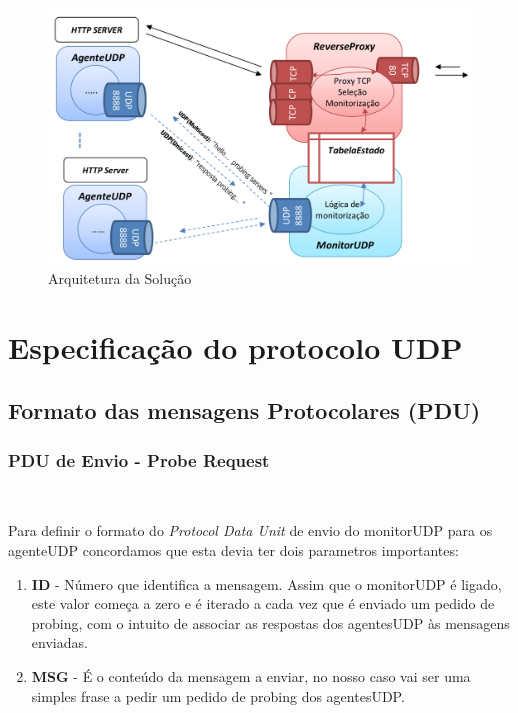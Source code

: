 \documentclass{llncs}
\begin{document}
		\begin{figure}[h!]
		\centering
		\includegraphics[scale=0.3]{figura1} 
		\caption{Arquitetura da Solução}
		\end{figure} 



\section{Especificação do protocolo UDP}

	\subsection{Formato das mensagens Protocolares (PDU)}

		\subsubsection{PDU de Envio - Probe Request} \

			Para definir o formato do \textit{Protocol Data Unit} de envio do monitorUDP para os agenteUDP concordamos que esta devia ter dois parametros importantes:

				\begin{enumerate}

					\item \textbf{ID} - Número que identifica a mensagem. Assim que o monitorUDP é ligado, este valor começa a zero e é iterado a cada vez que é enviado um pedido de probing, com o intuito de associar as respostas dos agentesUDP às mensagens enviadas.

					\item \textbf{MSG} - É o conteúdo da mensagem a enviar, no nosso caso vai ser uma simples frase a pedir um pedido de probing dos agentesUDP.

				\end{enumerate}
\end{document}

